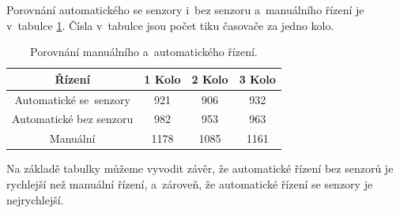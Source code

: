 Porovnání automatického se senzory i~bez senzoru a~manuálního řízení je v~tabulce 
\ref{tab:Comparison}. Čísla v~tabulce jsou počet tiku časovače za jedno kolo.
\begin{table}[!h]
    \centering
    \begin{tabular}{cccc}
        \hline
        \textbf{Řízení} & \textbf{1 Kolo} & \textbf{2 Kolo} & \textbf{3 Kolo} \\
        \hline
        Automatické se~senzory          & 921       & 906 & 932          \\
        Automatické bez senzoru & 982 & 953 & 963 \\
        Manuální 			  & 1178       & 1085 & 1161           \\
        \hline
    \end{tabular}
    \caption{Porovnání manuálního a~automatického řízení.}
    \label{tab:Comparison}
\end{table}

Na základě tabulky můžeme vyvodit závěr, že automatické řízení bez senzorů je 
rychlejší než manuální řízení, a~zároveň, že automatické řízení se senzory je 
nejrychlejší.

\endinput